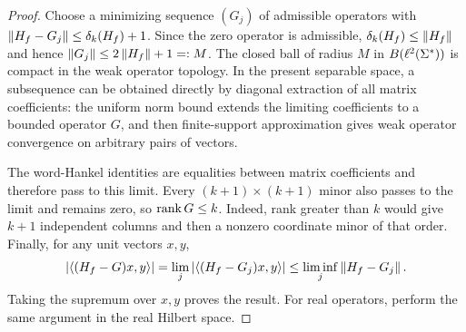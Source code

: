 \begin{proof}
Choose a minimizing sequence $(G_j)$ of admissible operators with
$\left\lVert H_f-G_j\right\rVert\le\delta_k(H_f)+1$. Since the zero operator is admissible,
$\delta_k(H_f)\le\left\lVert H_f\right\rVert$ and hence
$\left\lVert G_j\right\rVert\le 2\left\lVert H_f\right\rVert+1=:M$.
The closed ball of radius $M$ in $B(\ell^2(\Sigma^*))$ is compact in the weak operator topology. In the present separable space, a subsequence can be obtained directly by diagonal extraction of all matrix coefficients: the uniform norm bound extends the limiting coefficients to a bounded operator $G$, and then finite-support approximation gives weak operator convergence on arbitrary pairs of vectors.

The word-Hankel identities are equalities between matrix coefficients and therefore pass to this limit. Every $(k+1)\times(k+1)$ minor also passes to the limit and remains zero, so $\operatorname{rank} G\le k$. Indeed, rank greater than $k$ would give $k+1$ independent columns and then a nonzero coordinate minor of that order. Finally, for any unit vectors $x,y$,
\[
 |\langle(H_f-G)x,y\rangle|
 =\lim_j|\langle(H_f-G_j)x,y\rangle|
 \le\liminf_j\left\lVert H_f-G_j\right\rVert.
\]
Taking the supremum over $x,y$ proves the result. For real operators, perform the same argument in the real Hilbert space.
\end{proof}
